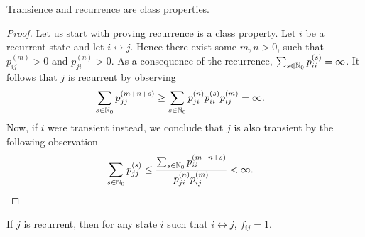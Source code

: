 \documentclass[a4paper,10pt,english]{article}
\begin{document}
\begin{prop}
Transience and recurrence are class properties.
\end{prop}
\begin{proof}
Let us start with proving recurrence is a class property. Let $i$ be a recurrent state and let $i \leftrightarrow j$. Hence there exist some $m,n >0$, such that $p_{ij}^{(m)} > 0$ and $p_{ji}^{(n)}>0$. As a consequence of the recurrence, $\sum_{s \in \mathbb{N}_0} p_{ii}^{(s)} = \infty$. 
It follows that $j$ is recurrent by observing 
\begin{align*}
\sum_{s \in \mathbb{N}_0} p_{jj}^{(m+n+s)} &\geq \sum_{s \in \mathbb{N}_0} p_{ji}^{(n)} p_{ii}^{(s)} p_{ij}^{(m)} = \infty.
\end{align*}
Now, if $i$ were transient instead, we conclude that $j$ is also transient by the following observation
\begin{align*}
\sum_{s \in \mathbb{N}_0}  p_{jj}^{(s)} &\leq \frac{\sum_{s \in \mathbb{N}_0} p_{ii}^{(m+n+s)} }{ p_{ji}^{(n)} p_{ij}^{(m)}}< \infty.
\end{align*}
\end{proof}



\begin{cor}
If $j$ is recurrent, then for any state $i$ such that $i\leftrightarrow j$, $f_{ij} = 1$.
\end{cor}
\end{document}
